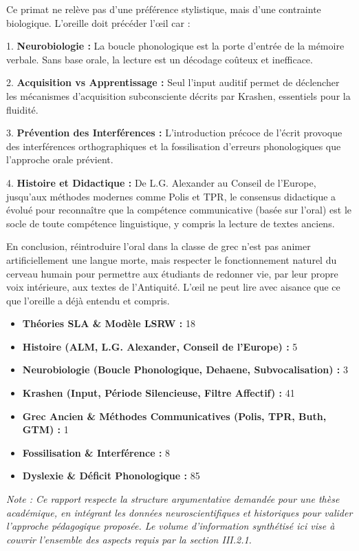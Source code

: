 Ce primat ne relève pas d'une préférence stylistique, mais d'une contrainte biologique. \og
L'oreille doit précéder l'œil\fg{} car :

1. \textbf{Neurobiologie :} La boucle phonologique est la porte d'entrée de la mémoire verbale. Sans
base orale, la lecture est un décodage coûteux et inefficace.\cite{III-2-1-ref23}

2. \textbf{Acquisition vs Apprentissage :} Seul l'input auditif permet de déclencher les mécanismes
d'acquisition subconsciente décrits par Krashen, essentiels pour la fluidité.\cite{III-2-1-ref41}

3. \textbf{Prévention des Interférences :} L'introduction précoce de l'écrit provoque des
interférences orthographiques et la fossilisation d'erreurs phonologiques que l'approche orale
prévient.\cite{III-2-1-ref8}

4. \textbf{Histoire et Didactique :} De L.G. Alexander au Conseil de l'Europe, jusqu'aux méthodes
modernes comme Polis et TPR, le consensus didactique a évolué pour reconnaître que la compétence
communicative (basée sur l'oral) est le socle de toute compétence linguistique, y compris la lecture
de textes anciens.\cite{III-2-1-ref15}

En conclusion, réintroduire l'oral dans la classe de grec n'est pas \og animer\fg{} artificiellement
une langue morte, mais respecter le fonctionnement naturel du cerveau humain pour permettre aux
étudiants de redonner vie, par leur propre voix intérieure, aux textes de l'Antiquité. L'œil ne peut
lire avec aisance que ce que l'oreille a déjà entendu et compris.

\begin{itemize}\item \textbf{Théories SLA \& Modèle LSRW :} 18\item \textbf{Histoire (ALM, L.G. Alexander, Conseil de l'Europe) :} 5\item \textbf{Neurobiologie (Boucle Phonologique, Dehaene, Subvocalisation) :} 3\item \textbf{Krashen (Input, Période Silencieuse, Filtre Affectif) :} 41\item \textbf{Grec Ancien \& Méthodes Communicatives (Polis, TPR, Buth, GTM) :} 1\item \textbf{Fossilisation \& Interférence :} 8\item \textbf{Dyslexie \& Déficit Phonologique :} 85\end{itemize}\textit{Note : Ce rapport respecte la structure argumentative demandée pour une thèse académique, en
intégrant les données neuroscientifiques et historiques pour valider l'approche pédagogique
proposée. Le volume d'information synthétisé ici vise à couvrir l'ensemble des aspects requis par la
section III.2.1.}

